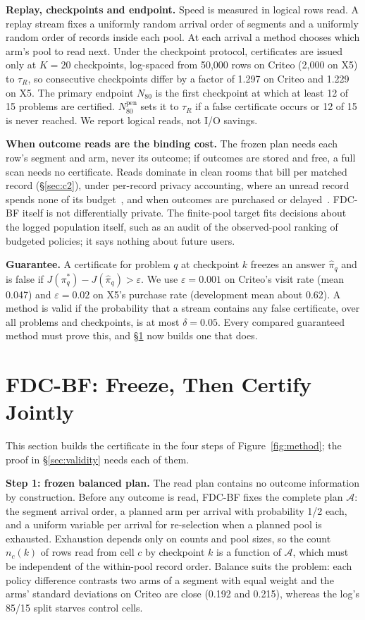 \documentclass[sigconf,anonymous,review]{acmart}
\newcommand{\cA}{\mathcal{A}}
\newcommand{\eps}{\varepsilon}
\newcommand{\Npen}{N_{80}^{\text{pen}}}
\begin{document}
\textbf{Replay, checkpoints and endpoint.} Speed is measured in logical rows read. A replay stream fixes a uniformly random arrival order of segments and a uniformly random order of records inside each pool. At each arrival a method chooses which arm's pool to read next. Under the checkpoint protocol, certificates are issued only at $K = 20$ checkpoints, log-spaced from 50,000 rows on Criteo (2,000 on X5) to $\tau_R$, so consecutive checkpoints differ by a factor of 1.297 on Criteo and 1.229 on X5. The primary endpoint $N_{80}$ is the first checkpoint at which at least 12 of 15 problems are certified. $\Npen$ sets it to $\tau_R$ if a false certificate occurs or 12 of 15 is never reached. We report logical reads, not I/O savings.

\textbf{When outcome reads are the binding cost.} The frozen plan needs each row's segment and arm, never its outcome; if outcomes are stored and free, a full scan needs no certificate. Reads dominate in clean rooms that bill per matched record (\S\ref{sec:c2}), under per-record privacy accounting, where an unread record spends none of its budget~\citep{feldman2021individual}, and when outcomes are purchased or delayed~\citep{chapelle2014modeling}. FDC-BF itself is not differentially private. The finite-pool target fits decisions about the logged population itself, such as an audit of the observed-pool ranking of budgeted policies; it says nothing about future users.

\textbf{Guarantee.} A certificate for problem $q$ at checkpoint $k$ freezes an answer $\hat\pi_q$ and is false if $J(\pi^*_q) - J(\hat\pi_q) > \eps$. We use $\eps = 0.001$ on Criteo's visit rate (mean 0.047) and $\eps = 0.02$ on X5's purchase rate (development mean about 0.62). A method is valid if the probability that a stream contains any false certificate, over all problems and checkpoints, is at most $\delta = 0.05$. Every compared guaranteed method must prove this, and \S\ref{sec:method} now builds one that does.

\section{FDC-BF: Freeze, Then Certify Jointly}\label{sec:method}

This section builds the certificate in the four steps of Figure~\ref{fig:method}; the proof in \S\ref{sec:validity} needs each of them.

\textbf{Step 1: frozen balanced plan.} The read plan contains no outcome information by construction. Before any outcome is read, FDC-BF fixes the complete plan $\cA$: the segment arrival order, a planned arm per arrival with probability 1/2 each, and a uniform variable per arrival for re-selection when a planned pool is exhausted. Exhaustion depends only on counts and pool sizes, so the count $n_c(k)$ of rows read from cell $c$ by checkpoint $k$ is a function of $\cA$, which must be independent of the within-pool record order. Balance suits the problem: each policy difference contrasts two arms of a segment with equal weight and the arms' standard deviations on Criteo are close (0.192 and 0.215), whereas the log's 85/15 split starves control cells.
\end{document}
